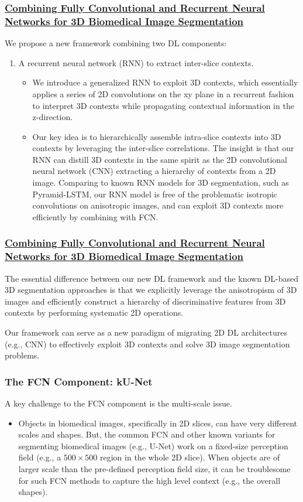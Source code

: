 \documentclass{beamer}
\begin{document}
\begin{frame}
  \frametitle{\href{https://arxiv.org/pdf/1609.01006v2.pdf}
    {Combining Fully Convolutional and Recurrent Neural Networks for 3D Biomedical Image Segmentation}}
  We propose a new framework combining two DL components:
    \begin{enumerate}
    \item A recurrent neural network (RNN) to extract inter-slice contexts.
      \begin{itemize}
      \item We introduce a generalized RNN to exploit 3D contexts, which essentially applies a series
        of 2D convolutions on the xy plane in a recurrent fashion to interpret 3D contexts while
        propagating contextual information in the z-direction. 
      \item Our key idea is to hierarchically assemble intra-slice contexts into 3D contexts by leveraging
        the inter-slice correlations.
        The insight is that our RNN can distill 3D contexts in the same spirit as the 2D convolutional
        neural network (CNN) extracting a hierarchy of contexts from a 2D image. Comparing to known RNN
        models for 3D segmentation, such as Pyramid-LSTM, our RNN model is free of the problematic
        isotropic convolutions on anisotropic images, and can exploit 3D contexts more efficiently by
        combining with FCN.
      \end{itemize}
    \end{enumerate}
\end{frame}

\begin{frame}
  \frametitle{\href{https://arxiv.org/pdf/1609.01006v2.pdf}
    {Combining Fully Convolutional and Recurrent Neural Networks for 3D Biomedical Image Segmentation}}
  The essential difference between our new DL framework and the known DL-based 3D segmentation approaches is
  that we explicitly leverage the anisotropism of 3D images and efficiently construct a hierarchy of discriminative
  features from 3D contexts by performing systematic 2D operations.

  Our framework can serve as a new paradigm of
  migrating 2D DL architectures (e.g., CNN) to effectively exploit 3D contexts and solve 3D image segmentation problems.
\end{frame}

\begin{frame}
  \frametitle{The FCN Component: kU-Net}
  A key challenge to the FCN component is the multi-scale issue. 
  \begin{itemize}
  \item Objects in biomedical images, specifically in 2D slices, can have very different scales and shapes.
    But, the common FCN and other known variants for segmenting biomedical images (e.g., U-Net) work on a
    fixed-size perception field (e.g., a $500\times500$ region in the whole 2D slice). When objects are of larger
    scale than the pre-defined perception field size, it can be troublesome for such FCN methods to capture
    the high level context (e.g., the overall shapes). 
  \end{itemize}
\end{frame}
\end{document}
